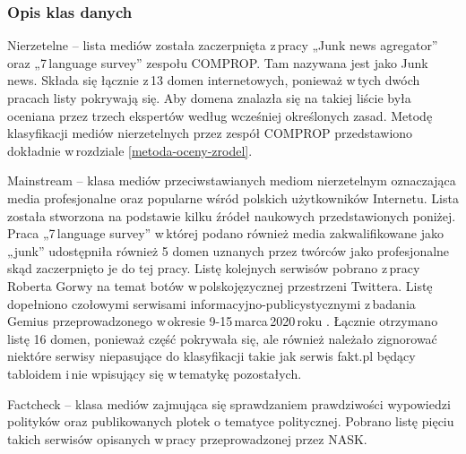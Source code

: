 \subsubsection{Opis klas danych}
\par
Nierzetelne – lista mediów została zaczerpnięta z\,pracy „Junk news agregator” \cite{liotsiou2019junk} oraz „7\,language survey” \cite{marchal2019junk} zespołu COMPROP. Tam nazywana jest jako Junk news. Składa się łącznie z\,13 domen internetowych, ponieważ w\,tych dwóch pracach listy pokrywają się. Aby domena znalazła się na takiej liście była oceniana przez trzech ekspertów według wcześniej określonych zasad. Metodę klasyfikacji mediów nierzetelnych przez zespół COMPROP przedstawiono dokładnie w\,rozdziale \ref{metoda-oceny-zrodel}.
\par
Mainstream – klasa mediów przeciwstawianych mediom nierzetelnym oznaczająca media profesjonalne oraz popularne wśród polskich użytkowników Internetu. Lista została stworzona na podstawie kilku źródeł naukowych przedstawionych poniżej. Praca „7\,language survey” w\,której podano również media zakwalifikowane jako „junk” udostępniła również 5 domen uznanych przez twórców jako profesjonalne skąd zaczerpnięto je do tej pracy. Listę kolejnych serwisów pobrano z\,pracy Roberta Gorwy na temat botów w\,polskojęzycznej przestrzeni Twittera\cite{gorwa2017computational}. Listę dopełniono czołowymi serwisami informacyjno-publicystycznymi z\,badania Gemius przeprowadzonego w\,okresie 9-15\,marca\,2020\,roku \cite{GemiusSerwisy2020}. Łącznie otrzymano listę 16 domen, ponieważ część pokrywała się, ale również należało zignorować niektóre serwisy niepasujące do klasyfikacji takie jak serwis fakt.pl będący tabloidem i\,nie wpisujący się w\,tematykę pozostałych.
\par
Factcheck – klasa mediów zajmująca się sprawdzaniem prawdziwości wypowiedzi polityków oraz publikowanych plotek o tematyce politycznej. Pobrano listę pięciu takich serwisów opisanych w\,pracy przeprowadzonej przez NASK\cite{NASKZjawiskoDezinformacji2019}. 
